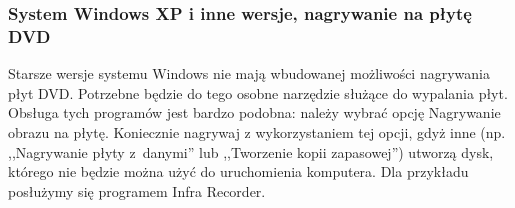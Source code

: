 \subsubsection{System Windows XP i inne wersje, nagrywanie na płytę DVD}
\begin{figure}
	\vspace{-10pt}
\end{figure}

Starsze wersje systemu Windows nie mają wbudowanej możliwości nagrywania płyt DVD. Potrzebne będzie do tego osobne narzędzie służące do wypalania płyt. Obsługa tych programów jest bardzo podobna: należy wybrać opcję \textcolor{ubuntu_orange}{Nagrywanie obrazu na płytę}. Koniecznie nagrywaj z wykorzystaniem tej opcji, gdyż inne (np. ,,Nagrywanie płyty z~danymi'' lub ,,Tworzenie kopii zapasowej'') utworzą dysk, którego nie będzie można użyć do uruchomienia komputera. Dla przykładu posłużymy się programem Infra Recorder.

